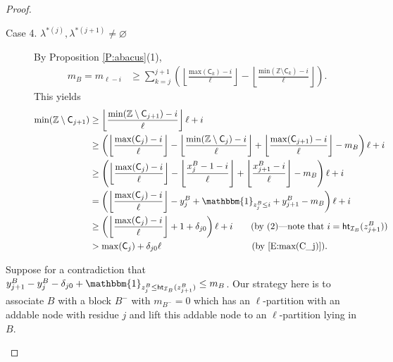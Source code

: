 \documentclass[11pt,a4paper,reqno]{amsart}
\numberwithin{equation}{section}
\theoremstyle{plain}
\theoremstyle{definition}
\theoremstyle{remark}
\numberwithin{equation}{section}
\newcommand{\bbone}{\mathbbm{1}}
\renewcommand{\min}{\mathrm{min}}
\renewcommand{\max}{\mathrm{max}}
\newcommand{\ZZ}{\mathbb{Z}}
\newcommand{\C}{\mathsf{C}}
\newcommand{\Ht}{\mathsf{ht}}
\newcommand{\II}{\mathcal{I}}
\begin{document}
\begin{proof}
\begin{description}
\begin{description}
  \item[Case 4. $\lambda^{*(j)} , \lambda^{*(j+1)} \ne \varnothing$]
  By Proposition \ref{P:abacus}(1),
  \begin{align*}
  m_B = m_{\ell - i}
  &\geq \sum_{k=j}^{j+1} \left( \left \lfloor \frac{\max(\C_{k}) - i}{\ell} \right\rfloor - \left \lfloor \frac{\min(\ZZ\setminus \C_{k}) -i}{\ell} \right\rfloor \right).
  \end{align*}
  This yields
  \begin{align*}
  \min(\ZZ \setminus \C_{j+1})
  &\geq
  \left\lfloor  \frac{\min(\ZZ\setminus \C_{j+1}) -i}{\ell} \right\rfloor \ell + i \notag \\
  &\geq
  \left( \left\lfloor \frac{\max(\C_{j}) - i}{\ell} \right\rfloor - \left\lfloor \frac{\min(\ZZ\setminus \C_{j}) -i}{\ell} \right\rfloor + \left\lfloor \frac{\max(\C_{j+1}) - i}{\ell} \right\rfloor - m_B \right) \ell + i  \notag \\
  &\geq
  \left( \left\lfloor \frac{\max(\C_{j}) - i}{\ell} \right\rfloor - \left\lfloor \frac{x^B_j -1 -i}{\ell} \right\rfloor + \left\lfloor \frac{x^B_{j+1} - i}{\ell} \right\rfloor - m_B \right) \ell + i  \notag \\
  &=
  \left( \left\lfloor \frac{\max(\C_{j}) - i}{\ell} \right\rfloor - y^B_j + \bbone_{z^B_j \leq i} + y^B_{j+1} - m_B \right) \ell + i  \notag \\
  &\geq
   \left( \left\lfloor \frac{\max(\C_{j}) - i}{\ell} \right\rfloor + 1 + \delta_{j0} \right) \ell + i \qquad (\text{by (2)---note that $i= \Ht_{\II_B}(z^B_{j+1})$}) \\
  &> \max(\C_j) + \delta_{j0} \ell \qquad \qquad \qquad \qquad \qquad  \text{(by \eqref{E:max(C_j)}).}
  \end{align*}
%
\end{description}


\item[$(3) \Rightarrow (2)$]
Suppose for a contradiction that $y^B_{j+1} - y^B_j - \delta_{j0} + \bbone_{z^B_j \leq \Ht_{\II_B}(z^B_{j+1})} \leq m_B$.
Our strategy here is to associate $B$ with a block $B^-$ with $m_{B^-} = 0$ which has an $\ell$-partition with an addable node with residue $j$ and lift this addable node to an $\ell$-partition lying in $B$.


\end{description}
\end{proof}
\end{document}
